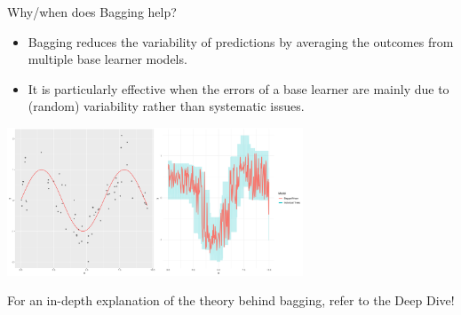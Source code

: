\documentclass[11pt,compress,t,notes=noshow, xcolor=table]{beamer}
\begin{document}
\begin{vbframe}{Why/when does Bagging help?}

\begin{itemize}
  \item Bagging reduces the variability of predictions by averaging the outcomes from multiple base learner models.

  \item It is particularly effective when the errors of a base learner are mainly due to (random) variability rather than systematic issues.
\end{itemize}

\begin{center}
\includegraphics[width=250pt]{figure/bagging-mean.png}
\end{center}

\footnotesize{For an in-depth explanation of the theory behind bagging, refer to the Deep Dive!}

\end{vbframe}
\end{document}
